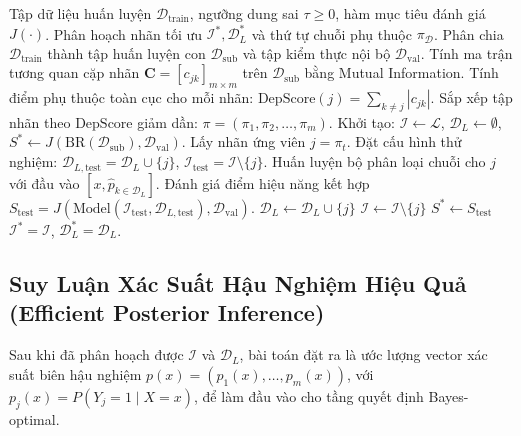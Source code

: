 \documentclass[11pt,a4paper]{article}
\begin{document}
\begin{algorithm}[htbp]
\caption{Thuật toán Tuyển chọn Tham lam Nhãn Độc lập (Greedy Selection of IL/DL)}
\label{alg:greedy_selection}
\begin{algorithmic}[1]
\REQUIRE Tập dữ liệu huấn luyện $\mathcal{D}_{\mathrm{train}}$, ngưỡng dung sai $\tau \ge 0$, hàm mục tiêu đánh giá $J(\cdot)$.
\ENSURE Phân hoạch nhãn tối ưu $\mathcal{I}^*, \mathcal{D}_L^*$ và thứ tự chuỗi phụ thuộc $\pi_{\mathcal{D}}$.
\STATE Phân chia $\mathcal{D}_{\mathrm{train}}$ thành tập huấn luyện con $\mathcal{D}_{\mathrm{sub}}$ và tập kiểm thực nội bộ $\mathcal{D}_{\mathrm{val}}$.
\STATE Tính ma trận tương quan cặp nhãn $\mathbf{C} = [c_{jk}]_{m \times m}$ trên $\mathcal{D}_{\mathrm{sub}}$ bằng Mutual Information.
\STATE Tính điểm phụ thuộc toàn cục cho mỗi nhãn: $\mathrm{DepScore}(j) = \sum_{k \neq j} |c_{jk}|$.
\STATE Sắp xếp tập nhãn theo $\mathrm{DepScore}$ giảm dần: $\pi = (\pi_1, \pi_2, \dots, \pi_m)$.
\STATE Khởi tạo: $\mathcal{I} \leftarrow \mathcal{L}$, $\mathcal{D}_L \leftarrow \emptyset$, $S^* \leftarrow J(\mathrm{BR}(\mathcal{D}_{\mathrm{sub}}), \mathcal{D}_{\mathrm{val}})$.
    \STATE Lấy nhãn ứng viên $j = \pi_t$.
    \STATE Đặt cấu hình thử nghiệm: $\mathcal{D}_{L,\mathrm{test}} = \mathcal{D}_L \cup \{j\}$, $\mathcal{I}_{\mathrm{test}} = \mathcal{I} \setminus \{j\}$.
    \STATE Huấn luyện bộ phân loại chuỗi cho $j$ với đầu vào $[x, \hat{p}_{k \in \mathcal{D}_L}]$.
    \STATE Đánh giá điểm hiệu năng kết hợp $S_{\mathrm{test}} = J(\mathrm{Model}(\mathcal{I}_{\mathrm{test}}, \mathcal{D}_{L,\mathrm{test}}), \mathcal{D}_{\mathrm{val}})$.
        \STATE $\mathcal{D}_L \leftarrow \mathcal{D}_L \cup \{j\}$
        \STATE $\mathcal{I} \leftarrow \mathcal{I} \setminus \{j\}$
        \STATE $S^* \leftarrow S_{\mathrm{test}}$
    \ENDIF
\ENDFOR
\RETURN $\mathcal{I}^* = \mathcal{I}$, $\mathcal{D}_L^* = \mathcal{D}_L$.
\end{algorithmic}
\end{algorithm}

\subsection{Suy Luận Xác Suất Hậu Nghiệm Hiệu Quả (Efficient Posterior Inference)}
Sau khi đã phân hoạch được $\mathcal{I}$ và $\mathcal{D}_L$, bài toán đặt ra là ước lượng vector xác suất biên hậu nghiệm $p(x) = (p_1(x), \dots, p_m(x))$, với $p_j(x) = P(Y_j = 1 \mid X = x)$, để làm đầu vào cho tầng quyết định Bayes-optimal.
\end{document}
